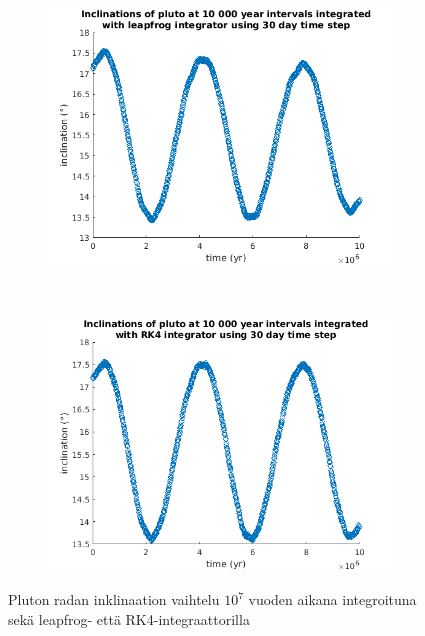 \documentclass[12pt,a4paper,titlepage]{article}
\begin{document}
\begin{figure}[h!]
    \centering
    \begin{subfigure}[b]{0.8\textwidth}
        \includegraphics[width=\textwidth]{../plots/lf-longrun-inclination.png}
    \end{subfigure}
    \\
    \begin{subfigure}[b]{0.8\textwidth}
        \includegraphics[width=\textwidth]{../plots/rk-longrun-inclination.png}
    \end{subfigure}
    \caption{Pluton radan inklinaation vaihtelu $10^7$ vuoden aikana integroituna sekä leapfrog- että RK4-integraattorilla}\label{longrun-inclinations}
\end{figure}
\end{document}
